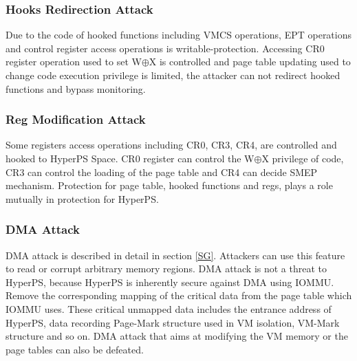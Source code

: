 \subsubsection{Hooks Redirection Attack}

Due to the code of hooked functions including VMCS operations, EPT operations and control register access operations is writable-protection. Accessing CR0 register operation used to set W$\oplus${X} is controlled and page table updating used to change code execution privilege is limited, the attacker can not redirect hooked functions and bypass monitoring.

\subsubsection{Reg Modification Attack}

Some registers access operations including CR0, CR3, CR4, are controlled and hooked to HyperPS Space. CR0 register can control the W$\oplus${X} privilege of code, CR3 can control the loading of the page table and CR4 can decide SMEP mechanism. Protection for page table, hooked functions and regs, plays a role mutually in protection for HyperPS. 

\subsubsection{DMA Attack}

 DMA attack is described in detail in section \ref{SG}. Attackers can use this feature to read or corrupt arbitrary memory regions. DMA attack is not a threat to HyperPS, because HyperPS is inherently secure against DMA using IOMMU. Remove the corresponding mapping of the critical data from the page table which IOMMU uses. These critical unmapped data includes the entrance address of HyperPS, data recording Page-Mark structure used in VM isolation, VM-Mark structure and so on. DMA attack that aims at modifying the VM memory or the page tables can also be defeated.

\fi



